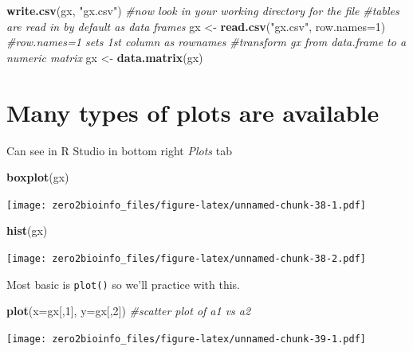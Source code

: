 \documentclass[]{article}
\newenvironment{Shaded}{\begin{snugshade}}{\end{snugshade}}
\newcommand{\KeywordTok}[1]{\textcolor[rgb]{0.13,0.29,0.53}{\textbf{#1}}}
\newcommand{\DataTypeTok}[1]{\textcolor[rgb]{0.13,0.29,0.53}{#1}}
\newcommand{\DecValTok}[1]{\textcolor[rgb]{0.00,0.00,0.81}{#1}}
\newcommand{\StringTok}[1]{\textcolor[rgb]{0.31,0.60,0.02}{#1}}
\newcommand{\CommentTok}[1]{\textcolor[rgb]{0.56,0.35,0.01}{\textit{#1}}}
\newcommand{\NormalTok}[1]{#1}
\begin{document}
\begin{Shaded}
\begin{Highlighting}[]
\KeywordTok{write.csv}\NormalTok{(gx, }\StringTok{"gx.csv"}\NormalTok{) }\CommentTok{#now look in your working directory for the file}
\CommentTok{#tables are read in by default as data frames}
\NormalTok{gx <-}\StringTok{ }\KeywordTok{read.csv}\NormalTok{(}\StringTok{"gx.csv"}\NormalTok{, }\DataTypeTok{row.names=}\DecValTok{1}\NormalTok{) }\CommentTok{#row.names=1 sets 1st column as rownames}
\CommentTok{#transform gx from data.frame to a numeric matrix}
\NormalTok{gx <-}\StringTok{ }\KeywordTok{data.matrix}\NormalTok{(gx)}
\end{Highlighting}
\end{Shaded}

\section{Many types of plots are
available}\label{many-types-of-plots-are-available}

Can see in R Studio in bottom right \emph{Plots} tab

\begin{Shaded}
\begin{Highlighting}[]
\KeywordTok{boxplot}\NormalTok{(gx)}
\end{Highlighting}
\end{Shaded}

\texttt{[image: zero2bioinfo\_files/figure-latex/unnamed-chunk-38-1.pdf]}

\begin{Shaded}
\begin{Highlighting}[]
\KeywordTok{hist}\NormalTok{(gx)}
\end{Highlighting}
\end{Shaded}

\texttt{[image: zero2bioinfo\_files/figure-latex/unnamed-chunk-38-2.pdf]}

Most basic is \texttt{plot()} so we'll practice with this.

\begin{Shaded}
\begin{Highlighting}[]
\KeywordTok{plot}\NormalTok{(}\DataTypeTok{x=}\NormalTok{gx[,}\DecValTok{1}\NormalTok{], }\DataTypeTok{y=}\NormalTok{gx[,}\DecValTok{2}\NormalTok{]) }\CommentTok{#scatter plot of a1 vs a2}
\end{Highlighting}
\end{Shaded}

\texttt{[image: zero2bioinfo\_files/figure-latex/unnamed-chunk-39-1.pdf]}
\end{document}
